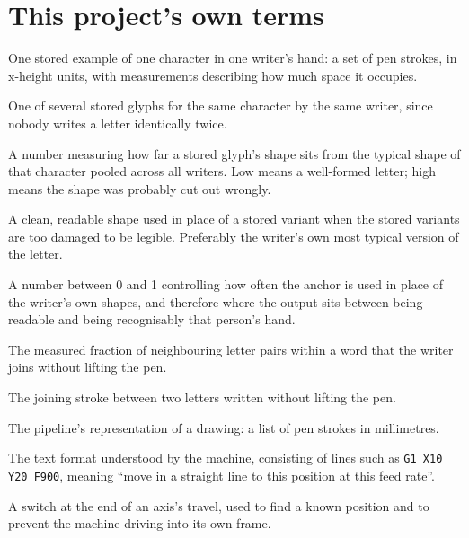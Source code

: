 \documentclass[11pt,a4paper,oneside]{report}
\begin{document}
\section{This project's own terms}
\begin{description}[style=nextline,leftmargin=1.4em]
  \item[Glyph] One stored example of one character in one writer's hand: a
        set of pen strokes, in x-height units, with measurements describing
        how much space it occupies.
  \item[Variant] One of several stored glyphs for the same character by the
        same writer, since nobody writes a letter identically twice.
  \item[Prior distance] A number measuring how far a stored glyph's shape
        sits from the typical shape of that character pooled across all
        writers. Low means a well-formed letter; high means the shape was
        probably cut out wrongly.
  \item[Anchor, or fallback letterform] A clean, readable shape used in place
        of a stored variant when the stored variants are too damaged to be
        legible. Preferably the writer's own most typical version of the
        letter.
  \item[Legibility lambda] A number between 0 and 1 controlling how often the
        anchor is used in place of the writer's own shapes, and therefore
        where the output sits between being readable and being recognisably
        that person's hand.
  \item[Connectedness] The measured fraction of neighbouring letter pairs
        within a word that the writer joins without lifting the pen.
  \item[Ligature] The joining stroke between two letters written without
        lifting the pen.
  \item[Trajectory] The pipeline's representation of a drawing: a list of pen
        strokes in millimetres.
  \item[G-code] The text format understood by the machine, consisting of
        lines such as \texttt{G1 X10 Y20 F900}, meaning ``move in a straight
        line to this position at this feed rate''.
  \item[Endstop] A switch at the end of an axis's travel, used to find a
        known position and to prevent the machine driving into its own
        frame.
\end{description}

























\end{document}
